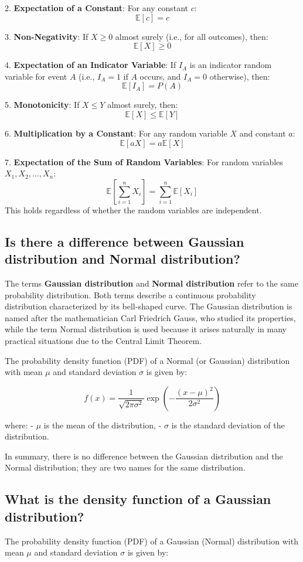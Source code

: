 2. \textbf{Expectation of a Constant}:
   For any constant $c$:
   \[
   \mathbb{E}[c] = c
   \]

3. \textbf{Non-Negativity}:
   If $X \geq 0$ almost surely (i.e., for all outcomes), then:
   \[
   \mathbb{E}[X] \geq 0
   \]

4. \textbf{Expectation of an Indicator Variable}:
   If $I_A$ is an indicator random variable for event $A$ (i.e., $I_A = 1$ if $A$ occurs, and $I_A = 0$ otherwise), then:
   \[
   \mathbb{E}[I_A] = P(A)
   \]

5. \textbf{Monotonicity}:
   If $X \leq Y$ almost surely, then:
   \[
   \mathbb{E}[X] \leq \mathbb{E}[Y]
   \]

6. \textbf{Multiplication by a Constant}:
   For any random variable $X$ and constant $a$:
   \[
   \mathbb{E}[aX] = a\mathbb{E}[X]
   \]

7. \textbf{Expectation of the Sum of Random Variables}:
   For random variables $X_1, X_2, \dots, X_n$:
   \[
   \mathbb{E}\left[\sum_{i=1}^{n} X_i\right] = \sum_{i=1}^{n} \mathbb{E}[X_i]
   \]
   This holds regardless of whether the random variables are independent.


\subsection{Is there a difference between Gaussian distribution and Normal distribution?}
The terms \textbf{Gaussian distribution} and \textbf{Normal distribution} refer to the same probability distribution. Both terms describe a continuous probability distribution characterized by its bell-shaped curve. The Gaussian distribution is named after the mathematician Carl Friedrich Gauss, who studied its properties, while the term Normal distribution is used because it arises naturally in many practical situations due to the Central Limit Theorem.

The probability density function (PDF) of a Normal (or Gaussian) distribution with mean $\mu$ and standard deviation $\sigma$ is given by:

\[
f(x) = \frac{1}{\sqrt{2 \pi \sigma^2}} \exp\left(-\frac{(x - \mu)^2}{2 \sigma^2}\right)
\]

where:
- $\mu$ is the mean of the distribution,
- $\sigma$ is the standard deviation of the distribution.

In summary, there is no difference between the Gaussian distribution and the Normal distribution; they are two names for the same distribution.

\subsection{What is the density function of a Gaussian distribution?}
The probability density function (PDF) of a Gaussian (Normal) distribution with mean $\mu$ and standard deviation $\sigma$ is given by:

